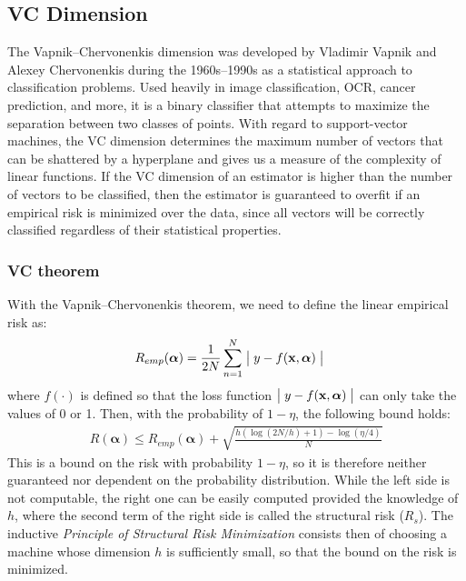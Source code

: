 \documentclass[journal]{IEEEtran}
\begin{document}
\subsection{VC Dimension}

The Vapnik--Chervonenkis dimension was developed by Vladimir Vapnik and Alexey Chervonenkis during the 1960s--1990s as a statistical approach to classification problems. Used heavily in image classification, OCR, cancer prediction, and more, it is a binary classifier that attempts to maximize the separation between two classes of points. With regard to support-vector machines, the VC dimension determines the maximum number of vectors that can be shattered by a hyperplane and gives us a measure of the complexity of linear functions. If the VC dimension of an estimator is higher than the number of vectors to be classified, then the estimator is guaranteed to overfit if an empirical risk is minimized over the data, since all vectors will be correctly classified regardless of their statistical properties.

\subsubsection{VC theorem}

With the Vapnik--Chervonenkis theorem, we need to define the linear empirical risk as:
\begin{align}
	R_{emp}(\bm{\alpha}) &=\frac{1}{2N}\sum_{n=1}^{N} \bigm\lvert y-f(\bm{\mathrm{x}},\bm{\alpha}) \bigm\rvert
\end{align}
where \( f(\cdot) \) is defined so that the loss function \( \bigm\lvert y-f(\bm{\mathrm{x}},\bm{\alpha}) \bigm\rvert \) can only take the values of 0 or 1. Then, with the probability of \( 1-\eta \), the following bound holds:
\begin{align}
	R(\bm{\alpha}) \leq R_{emp}(\bm{\alpha}) + \sqrt{\frac{h(\log(2N/h)+1)-\log(\eta / 4)}{N}}
\end{align}
This is a bound on the risk with probability \( 1-\eta \), so it is therefore neither guaranteed nor dependent on the probability distribution. While the left side is not computable, the right one can be easily computed provided the knowledge of \( h \), where the second term of the right side is called the structural risk (\( R_s \)). The inductive \textit{Principle of Structural Risk Minimization} consists then of choosing a machine whose dimension \( h \) is sufficiently small, so that the bound on the risk is minimized. 
\end{document}

